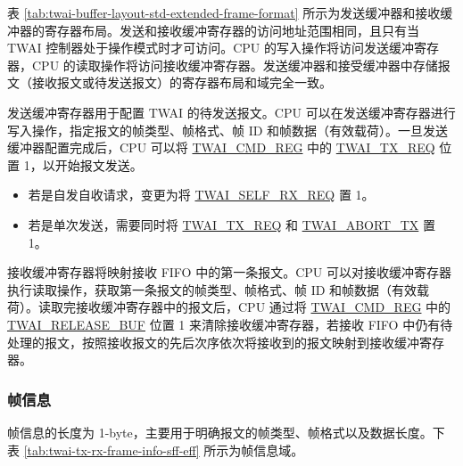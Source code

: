 \documentclass[main\_\_CN.tex]{subfiles}
\begin{document}


表 \ref{tab:twai-buffer-layout-std-extended-frame-format} 所示为发送缓冲器和接收缓冲器的寄存器布局。发送和接收缓冲寄存器的访问地址范围相同，且只有当 TWAI 控制器处于操作模式时才可访问。CPU 的写入操作将访问发送缓冲寄存器，CPU 的读取操作将访问接收缓冲寄存器。发送缓冲器和接受缓冲器中存储报文（接收报文或待发送报文）的寄存器布局和域完全一致。

发送缓冲寄存器用于配置 TWAI 的待发送报文。CPU 可以在发送缓冲寄存器进行写入操作，指定报文的帧类型、帧格式、帧 ID 和帧数据（有效载荷）。一旦发送缓冲器配置完成后，CPU 可以将 \hyperref[regdesc:TWAICMDREG]{TWAI\_CMD\_REG} 中的 \hyperref[fielddesc:TWAITXREQ]{TWAI\_TX\_REQ} 位置 1，以开始报文发送。

\begin{itemize}
    \item 若是自发自收请求，变更为将 \hyperref[fielddesc:TWAISELFRXREQ]{TWAI\_SELF\_RX\_REQ} 置 1。
    \item 若是单次发送，需要同时将 \hyperref[fielddesc:TWAITXREQ]{TWAI\_TX\_REQ} 和 \hyperref[fielddesc:TWAIABORTTX]{TWAI\_ABORT\_TX} 置 1。
\end{itemize}

接收缓冲寄存器将映射接收 FIFO 中的第一条报文。CPU 可以对接收缓冲寄存器执行读取操作，获取第一条报文的帧类型、帧格式、帧 ID 和帧数据（有效载荷）。读取完接收缓冲寄存器中的报文后，CPU 通过将 \hyperref[regdesc:TWAICMDREG]{TWAI\_CMD\_REG} 中的 \hyperref[fielddesc:TWAIRELEASEBUF]{TWAI\_RELEASE\_BUF} 位置 1 来清除接收缓冲寄存器，若接收 FIFO 中仍有待处理的报文，按照接收报文的先后次序依次将接收到的报文映射到接收缓冲寄存器。

\subsubsection{帧信息}
帧信息的长度为 1-byte，主要用于明确报文的帧类型、帧格式以及数据长度。下表 \ref{tab:twai-tx-rx-frame-info-sff-eff} 所示为帧信息域。
\end{document}

